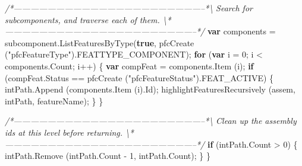 \documentclass[]{article}
\newenvironment{Shaded}{}{}
\newcommand{\KeywordTok}[1]{\textcolor[rgb]{0.00,0.44,0.13}{\textbf{{#1}}}}
\newcommand{\DecValTok}[1]{\textcolor[rgb]{0.25,0.63,0.44}{{#1}}}
\newcommand{\StringTok}[1]{\textcolor[rgb]{0.25,0.44,0.63}{{#1}}}
\newcommand{\CommentTok}[1]{\textcolor[rgb]{0.38,0.63,0.69}{\textit{{#1}}}}
\newcommand{\OtherTok}[1]{\textcolor[rgb]{0.00,0.44,0.13}{{#1}}}
\newcommand{\FunctionTok}[1]{\textcolor[rgb]{0.02,0.16,0.49}{{#1}}}
\newcommand{\NormalTok}[1]{{#1}}
\begin{document}
\begin{Shaded}
\begin{Highlighting}[]
\CommentTok{/*--------------------------------------------------------------------*\textbackslash{} }
\CommentTok{  Search for subcomponents, and traverse each of them.}
\CommentTok{\textbackslash{}*--------------------------------------------------------------------*/} 
  \KeywordTok{var} \NormalTok{components = }\OtherTok{subcomponent}\NormalTok{.}\FunctionTok{ListFeaturesByType}\NormalTok{(}\KeywordTok{true}\NormalTok{, }
        \FunctionTok{pfcCreate} \NormalTok{(}\StringTok{"pfcFeatureType"}\NormalTok{).}\FunctionTok{FEATTYPE_COMPONENT}\NormalTok{);}
  \KeywordTok{for} \NormalTok{(}\KeywordTok{var} \NormalTok{i = }\DecValTok{0}\NormalTok{; i < }\OtherTok{components}\NormalTok{.}\FunctionTok{Count}\NormalTok{; i++)}
    \NormalTok{\{}
      \KeywordTok{var} \NormalTok{compFeat = }\OtherTok{components}\NormalTok{.}\FunctionTok{Item} \NormalTok{(i);}
      \KeywordTok{if} \NormalTok{(}\OtherTok{compFeat}\NormalTok{.}\FunctionTok{Status} \NormalTok{== }\FunctionTok{pfcCreate} \NormalTok{(}\StringTok{"pfcFeatureStatus"}\NormalTok{).}\FunctionTok{FEAT_ACTIVE}\NormalTok{)}
    \NormalTok{\{}
      \OtherTok{intPath}\NormalTok{.}\FunctionTok{Append} \NormalTok{(}\OtherTok{components}\NormalTok{.}\FunctionTok{Item} \NormalTok{(i).}\FunctionTok{Id}\NormalTok{);}
      \FunctionTok{highlightFeaturesRecursively} \NormalTok{(assem, intPath, featureName); }
    \NormalTok{\}}
    \NormalTok{\}}
    
\CommentTok{/*--------------------------------------------------------------------*\textbackslash{} }
\CommentTok{  Clean up the assembly ids at this level before returning.}
\CommentTok{\textbackslash{}*--------------------------------------------------------------------*/} 
  \KeywordTok{if} \NormalTok{(}\OtherTok{intPath}\NormalTok{.}\FunctionTok{Count} \NormalTok{> }\DecValTok{0}\NormalTok{)}
    \NormalTok{\{}
      \OtherTok{intPath}\NormalTok{.}\FunctionTok{Remove} \NormalTok{(}\OtherTok{intPath}\NormalTok{.}\FunctionTok{Count} \NormalTok{- }\DecValTok{1}\NormalTok{, }\OtherTok{intPath}\NormalTok{.}\FunctionTok{Count}\NormalTok{);}
    \NormalTok{\} }
\NormalTok{\}}
\end{Highlighting}
\end{Shaded}
\end{document}
